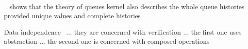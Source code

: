 ~\cite{conf/popl/BouajjaniEEH15}

~\cite{conf/concur/HenzingerSV13} shows that the theory of queues kernel also describes the whole queue histories provided unique values and complete histories

Data independence~\cite{conf/tacas/AbdullaHHJR13,DBLP:conf/issta/ShachamYGABSV14,DBLP:conf/popl/Wolper86} ... they are concerned with verification ... the first one uses abstraction ... the second one is concerned with composed operations